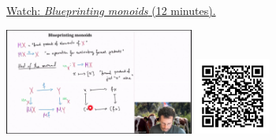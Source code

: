 
\begin{minipage}{10cm}
    \href{https://act4e-spring21.netlify.app/videos/spring2021-monads-b:blueprint-monoids.html}{Watch: \emph{Blueprinting monoids} (12 minutes).}
        
    \href{https://act4e-spring21.netlify.app/videos/spring2021-monads-b:blueprint-monoids.html}{\includegraphics[height=3.5cm]{spring2021-monads-b:blueprint-monoids/thumbnails.jpg}}
    \href{https://act4e-spring21.netlify.app/videos/spring2021-monads-b:blueprint-monoids.html}{\includegraphics[height=2.5cm]{spring2021-monads-b:blueprint-monoids/qrcode.png}}
\end{minipage}
